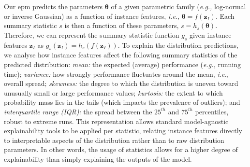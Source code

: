 Our \gls{epm} predicts the parameters $\boldsymbol\theta$ of a given parametric family (\emph{e.g.,} log-normal or inverse Gaussian) as a function of instance features, \emph{i.e.}, $\boldsymbol\theta=f(\mathbf{z}_I)$. Each summary statistic $s$ is then a function of these parameters, $s=h_s(\boldsymbol\theta)$. 
Therefore, we can represent the summary statistic function $g_s$ given instance features $\mathbf{z}_I$ as
    $g_s(\mathbf{z}_I) = h_s(f(\mathbf{z}_I))$.
To explain the distribution predictions, we analyse how instance features affect the following summary statistics of the predicted distribution: 
\emph{mean:} the expected (average) performance (\emph{e.g.,} running time);
\emph{variance:} how strongly performance fluctuates around the mean, \emph{i.e.,} overall spread;
\emph{skewness:} the degree to which the distribution is uneven toward unusually small or large performance values;
\emph{kurtosis:} the extent to which  probability mass lies in the tails (which impacts the prevalence of outliers); and
\emph{interquartile range (IQR):} the spread between the $25^{th}$ and $75^{th}$ percentiles, robust to extreme runs.
This representation allows standard model-agnostic explainability tools to be applied per statistic, relating instance features directly to interpretable aspects of the distribution rather than to raw distribution parameters.
In other words, the usage of statistics allows for a higher degree of explainability than simply explaining the outputs of the model.


